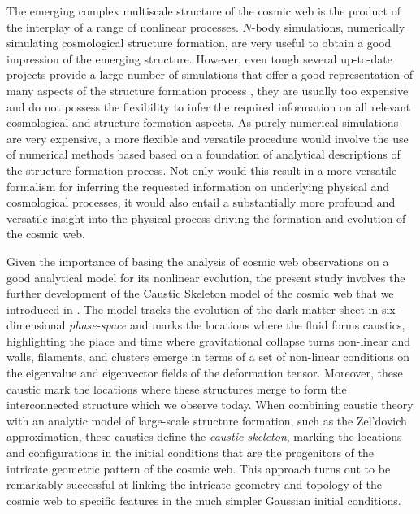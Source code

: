 \documentclass[a4paper, 11pt]{article}
\begin{document}
The emerging complex multiscale structure of the cosmic web is the product of the interplay of a range of nonlinear processes. $N$-body simulations, numerically simulating cosmological structure formation, are very useful to obtain a good impression of the
emerging structure. However, even tough several up-to-date projects provide a large number of simulations that offer a good representation of many aspects of the structure formation process \citep{ABACUSSUMMIT:2021, Quijote:2020}, they are usually too expensive and do not possess the flexibility to infer the required information on all relevant cosmological and structure formation aspects. As purely numerical simulations are very expensive, a more flexible and versatile procedure would involve the use of numerical methods based based on a foundation of analytical descriptions of the structure formation process. Not only would this result in a more versatile formalism for inferring the requested information on underlying physical and cosmological processes, it would also entail a substantially more profound and versatile insight into the physical process driving the formation and evolution of the cosmic web.

Given the importance of basing the analysis of cosmic web observations on a good analytical model for its nonlinear evolution, the present study involves the further development of the Caustic Skeleton model of the cosmic web that we introduced in \citep{Feldbrugge:2018}. The model tracks the evolution of the dark matter sheet in six-dimensional \textit{phase-space} and marks the locations where the fluid forms caustics, highlighting the place and time where gravitational collapse turns non-linear and walls, filaments, and clusters emerge in terms of a set of non-linear conditions on the eigenvalue and eigenvector fields of the deformation tensor. Moreover, these caustic mark the locations where these structures merge to form the interconnected structure which we observe today. When combining caustic theory with an analytic model of large-scale structure formation, such as the Zel'dovich approximation, these caustics define the \textit{caustic skeleton}, marking the locations and configurations in the initial conditions that are the progenitors of the intricate geometric pattern of the cosmic web. This approach turns out to be remarkably successful at linking the intricate geometry and topology of the cosmic web to specific features in the much simpler Gaussian initial conditions.
\end{document}

